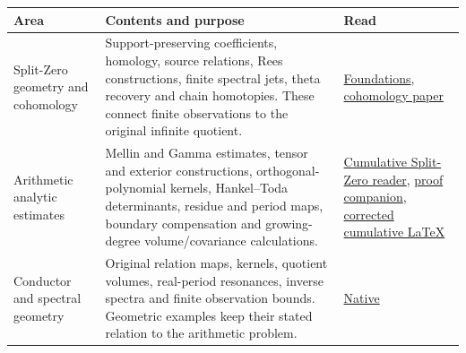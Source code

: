 \documentclass[
]{article}
\newcounter{none} %
\begin{document}
{\def\LTcaptype{none} %
\begin{longtable}[]{@{}
  >{\raggedright\arraybackslash}p{}
  >{\raggedright\arraybackslash}p{}
  >{\raggedright\arraybackslash}p{}@{}}
\toprule\noalign{}
\begin{minipage}[b]{\linewidth}\raggedright
Area
\end{minipage} & \begin{minipage}[b]{\linewidth}\raggedright
Contents and purpose
\end{minipage} & \begin{minipage}[b]{\linewidth}\raggedright
Read
\end{minipage} \\
\midrule\noalign{}
\endhead
\bottomrule\noalign{}
\endlastfoot
Split-Zero geometry and cohomology & Support-preserving coefficients,
homology, source relations, Rees constructions, finite spectral jets,
theta recovery and chain homotopies. These connect finite observations
to the original infinite quotient. &
\href{https://github.com/KokunoYumeto/zeta-function-research-reader/blob/main/RESEARCH_PROGRAMMES.md}{Foundations},
\href{https://zenodo.org/records/22865640/files/10-splitzero-cohomology-and-weight-control.pdf?download=1}{cohomology
paper} \\
Arithmetic analytic estimates & Mellin and Gamma estimates, tensor and
exterior constructions, orthogonal-polynomial kernels, Hankel--Toda
determinants, residue and period maps, boundary compensation and
growing-degree volume/covariance calculations. &
\href{https://zenodo.org/records/22865640/files/92-splitzero-cited-receiver-reader.pdf?download=1}{Cumulative
Split-Zero reader},
\href{https://zenodo.org/records/22865640/files/94-splitzero-cited-receiver-companion.pdf?download=1}{proof
companion},
\href{https://github.com/KokunoYumeto/zeta-function-research-reader/blob/666ee448d5ecb0bf8a4888f3a2aceaaa5c74d6d8/workbenches/splitzero-tandem/continuations/20260921-historical-proof-citations/README.md}{corrected
cumulative LaTeX} \\
Conductor and spectral geometry & Original relation maps, kernels,
quotient volumes, real-period resonances, inverse spectra and finite
observation bounds. Geometric examples keep their stated relation to the
arithmetic problem. &
\href{https://github.com/KokunoYumeto/zeta-function-research-reader/blob/0fd693c844aad9117e30ec447c59864a28af10f3/workbenches/splitzero-tandem/continuations/20260921-native-spectral-real-pair/README.md}{Native
}
\end{longtable}}
\end{document}
